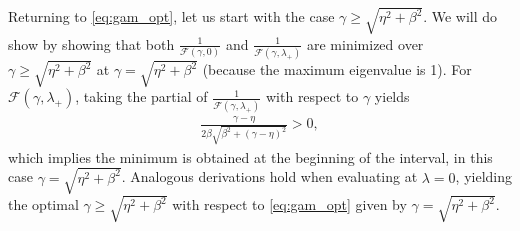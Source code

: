 \documentclass[a4paper,10pt]{article}
\begin{document}
Returning to \eqref{eq:gam_opt}, let us start with the case
$\gamma \geq \sqrt{\eta^2+\beta^2}$. We will do show by showing that both
$\tfrac{1}{\mathcal{F}(\gamma,0)}$ and $\tfrac{1}{\mathcal{F}(\gamma,\lambda_+)}$
are minimized over $\gamma \geq \sqrt{\eta^2+\beta^2}$ at
$\gamma = \sqrt{\eta^2+\beta^2}$ (because the maximum eigenvalue is 1).
For $\mathcal{F}(\gamma,\lambda_+)$, taking the partial of
$\tfrac{1}{\mathcal{F}(\gamma,\lambda_+)}$ with respect to $\gamma$ yields
%
\begin{align*}
\frac{\gamma-\eta}{2\beta\sqrt{\beta^2+(\gamma-\eta)^2}} > 0,
\end{align*}
%
which implies the minimum is obtained at the beginning of the interval, in
this case $\gamma = \sqrt{\eta^2+\beta^2}$. Analogous derivations hold when
evaluating at $\lambda=0$, yielding the optimal $\gamma \geq \sqrt{\eta^2+\beta^2}$
with respect to \eqref{eq:gam_opt} given by $\gamma = \sqrt{\eta^2+\beta^2}$.
\end{document}
